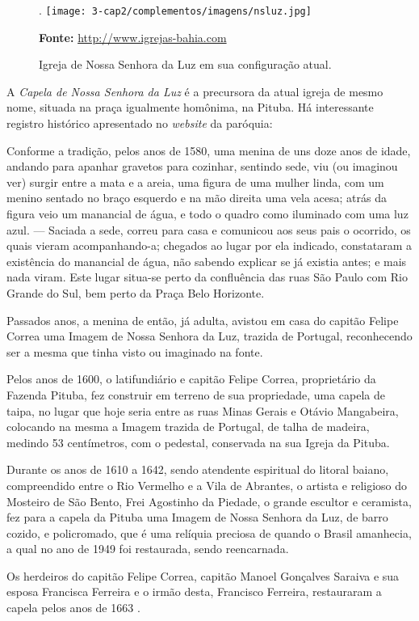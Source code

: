 \begin{figure}[!htp]
\centering
\caption{Igreja de Nossa Senhora da Luz em sua configuração atual.}.
\texttt{[image: 3-cap2/complementos/imagens/nsluz.jpg]}{\footnotesize \par \textbf{Fonte:} \url{http://www.igrejas-bahia.com} \par}
\end{figure}

A \textit{Capela de Nossa Senhora da Luz} é a precursora da atual igreja de mesmo nome, situada na praça igualmente homônima, na Pituba. Há interessante registro histórico apresentado no \textit{website} da paróquia:

\begin{citacao}
Conforme a tradição, pelos anos de 1580, uma menina de uns doze anos de idade, andando para apanhar gravetos para cozinhar, sentindo sede, viu (ou imaginou ver) surgir entre a mata e a areia, uma figura de uma mulher linda, com um menino sentado no braço esquerdo e na mão direita uma vela acesa; atrás da figura veio um manancial de água, e todo o quadro como iluminado com uma luz azul. --- Saciada a sede, correu para casa e comunicou aos seus pais o ocorrido, os quais vieram acompanhando-a; chegados ao lugar por ela indicado, constataram a existência do manancial de água, não sabendo explicar se já existia antes; e mais nada viram. Este lugar situa-se perto da confluência das ruas São Paulo com Rio Grande do Sul, bem perto da Praça Belo Horizonte.

Passados anos, a menina de então, já adulta, avistou em casa do capitão Felipe Correa uma Imagem de Nossa Senhora da Luz, trazida de Portugal, reconhecendo ser a mesma que tinha visto ou imaginado na fonte.

Pelos anos de 1600, o latifundiário e capitão Felipe Correa, proprietário da Fazenda Pituba, fez construir em terreno de sua propriedade, uma capela de taipa, no lugar que hoje seria entre as ruas Minas Gerais e Otávio Mangabeira, colocando na mesma a Imagem trazida de Portugal, de talha de madeira, medindo 53 centímetros, com o pedestal, conservada na sua Igreja da Pituba.

Durante os anos de 1610 a 1642, sendo atendente espiritual do litoral baiano, compreendido entre o Rio Vermelho e a Vila de Abrantes, o artista e religioso do Mosteiro de São Bento, Frei Agostinho da Piedade, o grande escultor e ceramista, fez para a capela da Pituba uma Imagem de Nossa Senhora da Luz, de barro cozido, e policromado, que é uma relíquia preciosa de quando o Brasil amanhecia, a qual no ano de 1949 foi restaurada, sendo reencarnada.

Os herdeiros do capitão Felipe Correa, capitão Manoel Gonçalves Saraiva e sua esposa Francisca Ferreira e o irmão desta, Francisco Ferreira, restauraram a capela pelos anos de 1663 \cite{fernandez_historia_1969}.
\end{citacao}

